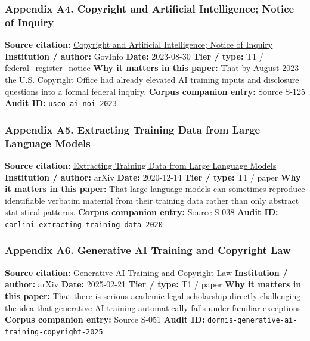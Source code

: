 \documentclass[
  american,
  11pt,
  letterpaper,
]{article}
\begin{document}
\subsubsection{Appendix A4. Copyright and Artificial Intelligence;
Notice of
Inquiry}\label{ch-04-appendix-a4-copyright-and-artificial-intelligence-notice-of-inquiry}

\textbf{Source citation:}
\href{https://www.govinfo.gov/content/pkg/FR-2023-08-30/pdf/2023-18624.pdf}{Copyright
and Artificial Intelligence; Notice of Inquiry} \textbf{Institution /
author:} GovInfo \textbf{Date:} 2023-08-30 \textbf{Tier / type:} T1 /
federal\_register\_notice \textbf{Why it matters in this paper:} That by
August 2023 the U.S. Copyright Office had already elevated AI training
inputs and disclosure questions into a formal federal inquiry.
\textbf{Corpus companion entry:} Source S-125 \textbf{Audit ID:}
\texttt{usco-ai-noi-2023}

\subsubsection{Appendix A5. Extracting Training Data from Large Language
Models}\label{ch-04-appendix-a5-extracting-training-data-from-large-language-models}

\textbf{Source citation:}
\href{https://arxiv.org/abs/2012.07805}{Extracting Training Data from
Large Language Models} \textbf{Institution / author:} arXiv
\textbf{Date:} 2020-12-14 \textbf{Tier / type:} T1 / paper \textbf{Why
it matters in this paper:} That large language models can sometimes
reproduce identifiable verbatim material from their training data rather
than only abstract statistical patterns. \textbf{Corpus companion
entry:} Source S-038 \textbf{Audit ID:}
\texttt{carlini-extracting-training-data-2020}

\subsubsection{Appendix A6. Generative AI Training and Copyright
Law}\label{ch-04-appendix-a6-generative-ai-training-and-copyright-law}

\textbf{Source citation:}
\href{https://arxiv.org/abs/2502.15858}{Generative AI Training and
Copyright Law} \textbf{Institution / author:} arXiv \textbf{Date:}
2025-02-21 \textbf{Tier / type:} T1 / paper \textbf{Why it matters in
this paper:} That there is serious academic legal scholarship directly
challenging the idea that generative AI training automatically falls
under familiar exceptions. \textbf{Corpus companion entry:} Source S-051
\textbf{Audit ID:} \texttt{dornis-generative-ai-training-copyright-2025}
\end{document}
